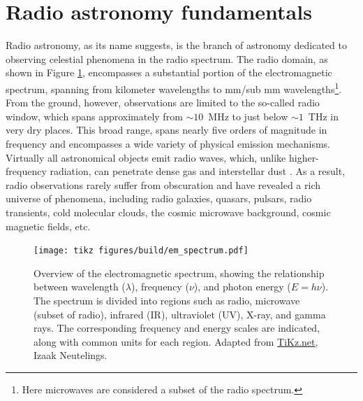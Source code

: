 \section{Radio astronomy fundamentals}
\label{sec:radio_fundamentals}
Radio astronomy, as its name suggests, is the branch of astronomy dedicated to observing celestial phenomena in the radio spectrum. The radio domain, as shown in Figure \ref{fig:radio_spectrum}, encompasses a substantial portion of the electromagnetic spectrum, spanning from kilometer wavelengths to mm/sub mm wavelengths\footnote{Here microwaves are considered a subset of the radio spectrum.}. From the ground, however, observations are limited to the so-called radio window, which spans approximately from $\sim10$~MHz to just below $\sim1$~THz in very dry places.
This broad range, spans nearly five orders of magnitude in frequency and encompasses a wide variety of physical emission mechanisms. Virtually all astronomical objects emit radio waves, which, unlike higher-frequency radiation, can penetrate dense gas and interstellar dust \citep{essential_radio_astronomy}. As a result, radio observations rarely suffer from obscuration and have revealed a rich universe of phenomena, including radio galaxies, quasars, pulsars, radio transients, cold molecular clouds, the cosmic microwave background, cosmic magnetic fields, etc.
\begin{figure}[h!]
	\centering
	\texttt{[image: tikz figures/build/em\_spectrum.pdf]}
	\caption[Electromagnetic spectrum overview]{Overview of the electromagnetic spectrum, showing the relationship between wavelength ($\lambda$), frequency ($\nu$), and photon energy ($E=h\nu$). The spectrum is divided into regions such as radio, microwave (subset of radio), infrared (IR), ultraviolet (UV), X-ray, and gamma rays. The corresponding frequency and energy scales are indicated, along with common units for each region. Adapted from \href{https://tikz.net/electromagnetic_spectrum/}{TiKz.net}, Izaak Neutelings.}
	\label{fig:radio_spectrum}
\end{figure}

